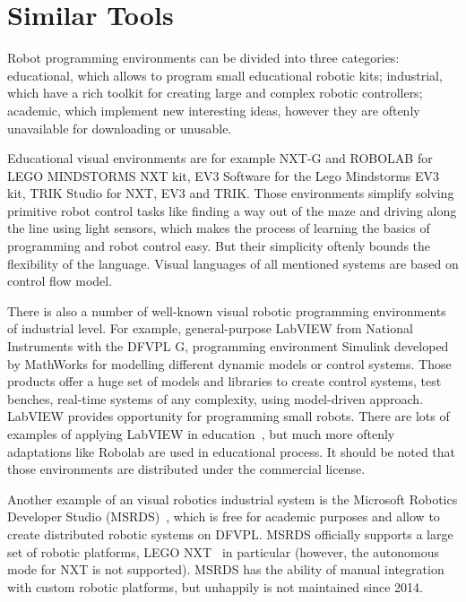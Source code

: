 \documentclass[conference,compsoc]{IEEEtran}
\begin{document}
\section{Similar Tools}
\label{sec:Overview}
Robot programming environments can be divided into three categories: educational, which allows to program small educational robotic kits; industrial, which have a rich toolkit for creating large and complex robotic controllers; academic, which implement new interesting ideas, however they are oftenly unavailable for downloading or unusable.

Educational visual environments are for example NXT-G and ROBOLAB for LEGO MINDSTORMS NXT kit, EV3 Software for the Lego Mindstorms EV3 kit, TRIK Studio for NXT, EV3 and TRIK. Those environments simplify solving primitive robot control tasks like finding a way out of the maze and driving along the line using light sensors, which makes the process of learning the basics of programming and robot control easy. But their simplicity oftenly bounds the flexibility of the language. Visual languages of all mentioned systems are based on control flow model.

There is also a number of well-known visual robotic programming environments of industrial level. For example, general-purpose LabVIEW from National Instruments with the DFVPL G, programming environment Simulink developed by MathWorks for modelling different dynamic models or control systems. Those products offer a huge set of models and libraries to create control systems, test benches, real-time systems of any complexity, using model-driven approach. LabVIEW provides opportunity for programming small robots. There are lots of examples of applying LabVIEW in education~\cite{erwin2000lego, 1_gomez-de-gabriel_mandow_fernandez-lozano_garcia-cerezo_2011}, but much more oftenly adaptations like Robolab are used in educational process. It should be noted that those environments are distributed under the commercial license.

Another example of an visual robotics industrial system is the Microsoft Robotics Developer Studio (MSRDS)~\cite{jackson2007microsoft}, which is free for academic purposes and allow to create distributed robotic systems on DFVPL. MSRDS officially supports a large set of robotic platforms, LEGO NXT~\cite{kim2007programming} in particular (however, the autonomous mode for NXT is not supported). MSRDS has the ability of manual integration with custom robotic platforms, but unhappily is not maintained since 2014.
\end{document}
